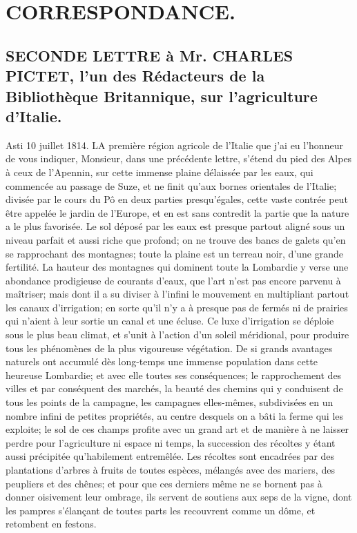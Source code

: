 \setcounter{page}{391}
\chapter{CORRESPONDANCE.}
\section{SECONDE LETTRE à Mr. CHARLES PICTET, l'un des Rédacteurs de la Bibliothèque Britannique, sur l'agriculture d'Italie.}
Asti 10 juillet 1814.
LA première région agricole de l'Italie que j'ai eu l'honneur de vous indiquer, Monsieur, dans une précédente lettre, s'étend du pied des Alpes à ceux de l'Apennin, sur cette immense plaine délaissée par les eaux, qui commencée au passage de Suze, et ne finit qu'aux bornes orientales de l'Italie; divisée par le cours du Pô en deux parties presqu'égales, cette vaste contrée peut être appelée le jardin de l'Europe, et en est sans contredit la partie que la nature a le plus favorisée.\setcounter{page}{392} Le sol déposé par les eaux est presque partout aligné sous un niveau parfait et aussi riche que profond; on ne trouve des bancs de galets qu'en se rapprochant des montagnes; toute la plaine est un terreau noir, d'une grande fertilité. La hauteur des montagnes qui dominent toute la Lombardie y verse une abondance prodigieuse de courants d'eaux, que l'art n'est pas encore parvenu à maîtriser; mais dont il a su diviser à l'infini le mouvement en multipliant partout les canaux d'irrigation; en sorte qu'il n'y a à presque pas de fermés ni de prairies qui n'aient à leur sortie un canal et une écluse.
Ce luxe d'irrigation se déploie sous le plus beau climat, et s'unit à l'action d'un soleil méridional, pour produire tous les phénomènes de la plus vigoureuse végétation.
De si grands avantages naturels ont accumulé dès long-temps une immense population dans cette heureuse Lombardie; et avec elle toutes ses conséquences; le rapprochement des villes et par conséquent des marchés, la beauté des chemins qui y conduisent de tous les points de la campagne, les campagnes elles-mêmes, subdivisées en un nombre infini de petites propriétés, au centre desquels on a bâti la ferme qui les exploite; le sol de ces champs profite avec\setcounter{page}{393} un grand art et de manière à ne laisser perdre pour l'agriculture ni espace ni temps, la succession des récoltes y étant aussi précipitée qu'habilement entremêlée. Les récoltes sont encadrées par des plantations d'arbres à fruits de toutes espèces, mélangés avec des mariers, des peupliers et des chênes; et pour que ces derniers même ne se bornent pas à donner oisivement leur ombrage, ils servent de soutiens aux seps de la vigne, dont les pampres s'élançant de toutes parts les recouvrent comme un dôme, et retombent en festons.
